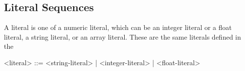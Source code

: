\subsection{Literal Sequences}

A literal is one of a numeric literal, which can be an integer literal or a float literal, a string literal, or an array literal. These are the same literals defined in the 

\begin{grammar}
	<literal> ::= <string-literal> | <integer-literal> | <float-literal>
\end{grammar} 
